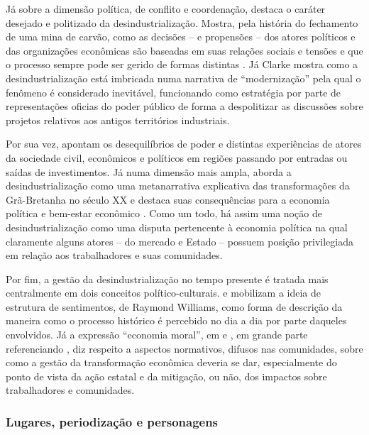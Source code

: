 Já sobre a dimensão política, de conflito e coordenação, \citet[p.~551]{phillips_closure_2015}
destaca o caráter desejado e politizado da desindustrialização.
Mostra, pela história do fechamento de uma mina de carvão, como as
decisões -- e propensões -- dos atores políticos e das organizações
econômicas são baseadas em suas relações sociais e tensões e que o
processo sempre pode ser gerido de formas distintas
\citep[p.~571--572]{phillips_closure_2015}. Já Clarke
\citep[p.~108]{clarke_closing_2015} mostra como a desindustrialização está imbricada numa
narrativa de ``modernização'' pela qual o fenômeno é considerado
inevitável, funcionando como estratégia por parte de representações
oficias do poder público de forma a despolitizar as discussões sobre
projetos relativos aos antigos territórios industriais.

Por sua vez, \citet[p.~45]{clark_voices_2020}
apontam os desequilíbrios de poder e distintas experiências de
atores da sociedade civil, econômicos e políticos em regiões passando
por entradas ou saídas de investimentos. Já numa dimensão mais ampla,
\citet{tomlinson_-industrialization_2016}
aborda a desindustrialização como uma metanarrativa explicativa das
transformações da Grã-Bretanha no século XX e destaca suas consequências
para a economia política e bem-estar econômico
\citep[p.~86]{tomlinson_-industrialization_2016}. Como um todo, há assim uma noção de desindustrialização como
uma disputa pertencente à economia política na qual claramente alguns
atores -- do mercado e Estado -- possuem posição privilegiada em relação
aos trabalhadores e suas comunidades.

Por fim, a gestão da desindustrialização no tempo presente é
tratada mais centralmente em dois conceitos político-culturais. \citet[p.~64]{rhodes_youngstowns_2013} e \citet{byrne_industrial_2002} mobilizam a
ideia de estrutura de sentimentos, de Raymond Williams, como forma de
descrição da maneira como o processo histórico é percebido no dia a dia
por parte daqueles envolvidos. Já a expressão ``economia moral'', em
\citet{gibbs_moral_2018} e
\citet{tomlinson_re-inventing_2011}, em
grande parte referenciando \citet{thompson_making_1966}, diz respeito
a aspectos normativos, difusos nas comunidades, sobre como a gestão da
transformação econômica deveria se dar, especialmente do ponto de vista
da ação estatal e da mitigação, ou não, dos impactos sobre trabalhadores
e comunidades.

\subsubsection{Lugares, periodização e personagens}

